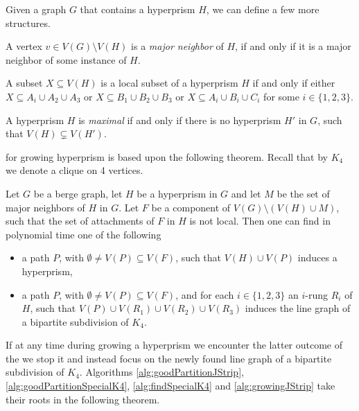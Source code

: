 Given a graph $G$ that contains a hyperprism $H$, we can define a few more structures.

\begin{defnTwo}
  A vertex $v \in V(G) \setminus V(H)$ is a \emph{major neighbor} of $H$, if and only if it is a major neighbor of some instance of $H$.
\end{defnTwo}

\begin{defnTwo}
  A subset $X \subseteq V(H)$ is a local subset of a hyperprism $H$ if and only if either $X \subseteq A_i \cup A_2 \cup A_3$ or $X \subseteq B_1 \cup B_2 \cup B_3$ or $X \subseteq A_i \cup B_i \cup C_i$ for some $i \in \{1, 2, 3\}$.
\end{defnTwo}

\begin{defnTwo}
  A hyperprism $H$ is \emph{maximal} if and only if there is no hyperprism $H'$ in $G$, such that $V(H) \varsubsetneq V(H')$.
\end{defnTwo}




 for growing hyperprism is based upon the following theorem. Recall that by $K_4$ we denote a clique on 4 vertices.
\begin{theorem}
  Let $G$ be a berge graph, let $H$ be a hyperprism in $G$ and let $M$ be the set of major neighbors of $H$ in $G$. Let $F$ be a component of $V(G) \setminus(V(H) \cup M)$, such that the set of attachments of $F$ in $H$ is not local. Then one can find in polynomial time one of the following
  \begin{itemize}
    \item a path $P$, with $\emptyset \neq V(P) \subseteq V(F)$, such that $V(H) \cup V(P)$ induces a hyperprism,
    \item a path $P$, with $\emptyset \neq V(P) \subseteq V(F)$, and for each $i \in \{1, 2, 3\}$ an $i$-rung $R_i$ of $H$, such that $V(P) \cup V(R_1) \cup V(R_2) \cup V(R_3)$ induces the line graph of a bipartite subdivision of $K_4$.
  \end{itemize}
  \label{thm:growingHyperprism}
\end{theorem}

If at any time during growing a hyperprism we encounter the latter outcome of the  we stop it and instead focus on the newly found line graph of a bipartite subdivision of $K_4$. Algorithms \ref{alg:goodPartitionJStrip}, \ref{alg:goodPartitionSpecialK4}, \ref{alg:findSpecialK4} and \ref{alg:growingJStrip} take their roots in the following theorem.

